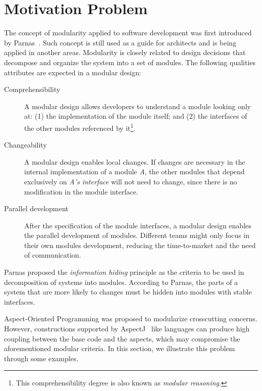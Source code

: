 \section{Motivation Problem}

The concept of modularity applied to software development was first
introduced by Parnas~\cite{parnas-on_the_criteria-cacm1972}. Such
concept is still used as a guide for architects and is being applied
in another areas. Modularity is closely related to design decisions
that decompose and organize the system into a set of modules. The
following qualities attributes are expected in a modular design:

\begin{description}

\item[Comprehensibility] A modular design allows developers to
understand a module looking only at: (1) the implementation of the
module itself; and (2) the interfaces of the other modules
referenced by it\footnote{This comprehensibility degree is also
known as \emph{modular reasoning}.}.

\item[Changeability] A modular design enables local
changes. If changes are necessary in the internal implementation of
a module \emph{A}, the other modules that depend exclusively on
\emph{A's interface} will not need to change, since there is no
modification in the module interface.

\item[Parallel development] After the specification of the module
interfaces, a modular design enables the parallel development of
modules. Different teams might only focus in their own modules
development, reducing the time-to-market and the need of
communication.

\end{description}

Parnas proposed the \emph{information hiding} principle as the
criteria to be used in decomposition of systems into modules.
According to Parnas, the parts of a system that are more likely to
changes must be hidden into modules with stable interfaces.

Aspect-Oriented Programming was proposed to modularize crosscutting
concerns. However, constructions supported by
AspectJ~\cite{kiczales-CACM2001} like languages can produce high
coupling between the base code and the aspects, which may compromise
the aforementioned modular criteria. In this section, we illustrate
this problem through some examples.

